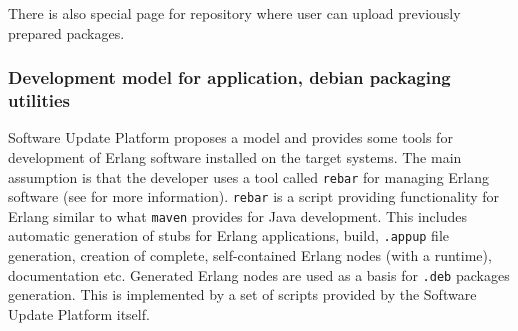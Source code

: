 There is also special page for repository where user can upload previously prepared packages.

\subsubsection{Development model for application, debian packaging utilities}
\label{devmodel}

Software Update Platform proposes a model and provides some tools for development of Erlang software installed
on the target systems. The main assumption is that the developer uses a tool called \texttt{rebar} for managing Erlang software (see \cite{rebar} for more information).
\texttt{rebar} is a script providing functionality for Erlang similar to what \texttt{maven} provides for Java development.
This includes automatic generation of stubs for Erlang applications, build, \texttt{.appup} file
generation, creation of complete, self-contained Erlang nodes (with a runtime), documentation etc.
Generated Erlang nodes are used as a basis for \texttt{.deb} packages generation. This is implemented by a set of
scripts provided by the Software Update Platform itself.

